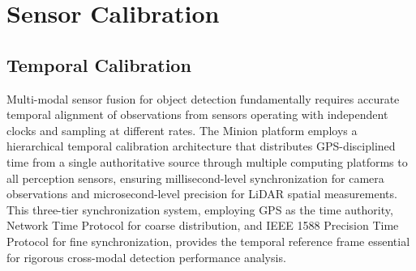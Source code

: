 \documentclass{erauthesis}
\begin{document}


\section{Sensor Calibration} \label{sec:calibration}


\subsection{Temporal Calibration}\label{time_sync}

Multi-modal sensor fusion for object detection fundamentally requires accurate temporal alignment of observations from sensors operating with independent clocks and sampling at different rates.
The Minion platform employs a hierarchical temporal calibration architecture that distributes GPS-disciplined time from a single authoritative source through multiple computing platforms to all perception sensors, ensuring millisecond-level synchronization for camera observations and microsecond-level precision for LiDAR spatial measurements.
This three-tier synchronization system, employing GPS as the time authority, Network Time Protocol for coarse distribution, and IEEE 1588 Precision Time Protocol for fine synchronization, provides the temporal reference frame essential for rigorous cross-modal detection performance analysis.
\end{document}
